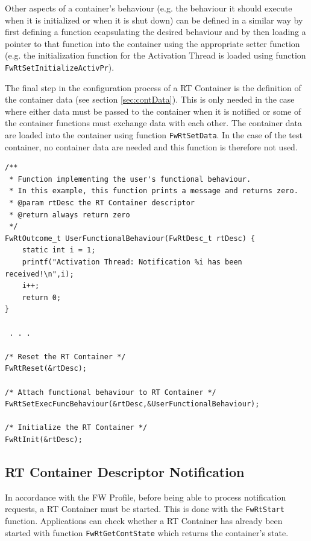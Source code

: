 \documentclass[manual]{../fwprofile}
\begin{document}
Other aspects of a container's behaviour (e.g. the behaviour it should execute when it is initialized or when it is shut down) can be defined in a similar way by first defining a function ecapsulating the desired behaviour and by then loading a pointer to that function into the container using the appropriate setter function (e.g. the initialization function for the Activation Thread is loaded using function \texttt{FwRtSetInitializeActivPr}).

The final step in the configuration process of a RT Container is the definition of the container data (see section \ref{sec:contData}). This is only needed in the case where either data must be passed to the container when it is notified or some of the container functions must exchange data with each other. The container data are loaded into the container using function \texttt{FwRtSetData}. In the case of the test container, no container data are needed and this function is therefore not used.

\begin{lstlisting}
/**
 * Function implementing the user's functional behaviour.
 * In this example, this function prints a message and returns zero.
 * @param rtDesc the RT Container descriptor
 * @return always return zero
 */
FwRtOutcome_t UserFunctionalBehaviour(FwRtDesc_t rtDesc) {
	static int i = 1;
	printf("Activation Thread: Notification %i has been received!\n",i);
	i++;
	return 0;
}

 . . .

/* Reset the RT Container */
FwRtReset(&rtDesc);

/* Attach functional behaviour to RT Container */
FwRtSetExecFuncBehaviour(&rtDesc,&UserFunctionalBehaviour);

/* Initialize the RT Container */
FwRtInit(&rtDesc);
\end{lstlisting}

\subsection{RT Container Descriptor Notification}\label{sec:rtNotification}
In accordance with the FW Profile, before being able to process notification requests, a RT Container must be started. This is done with the \texttt{FwRtStart} function. Applications can check whether a RT Container has already been started with function \texttt{FwRtGetContState} which returns the container's state.
\end{document}

